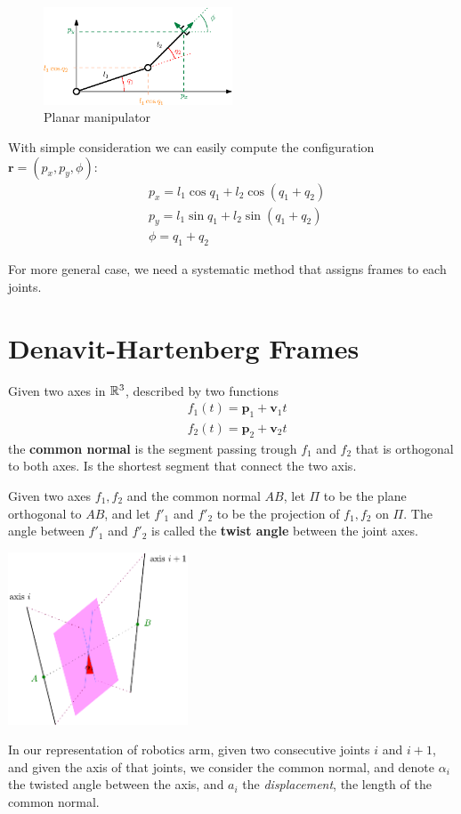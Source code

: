 \documentclass[10pt, letterpaper]{report}
\begin{document}
\begin{figure}[h!]
    \centering
    \includegraphics[width=0.5\textwidth ]{images/simple_dk.eps}
    \caption{Planar manipulator}
    \label{fig:simple_dk}
\end{figure}

With simple consideration we can easily compute the configuration $\mathbf r=(p_x,p_y,\phi)$:\begin{align}
    &p_x=l_1\cos q_1+l_2\cos(q_1+q_2)\\
    &p_y=l_1\sin q_1+l_2\sin(q_1+q_2)\\
    &\phi=q_1+q_2
\end{align}

For more general case, we need a systematic method that assigns frames to each joints.
\section{Denavit-Hartenberg Frames}
\begin{definition}
    Given two axes in ${\mathbb R}^3$, described by two functions\begin{align}
        &f_1(t)=\mathbf p_1+\mathbf v_1t\\ 
        &f_2(t)=\mathbf p_2+\mathbf v_2t
    \end{align}
    the \textbf{common normal} is the segment passing trough $f_1$ and $f_2$ that is orthogonal to both axes. Is the shortest segment that connect the two axis. 
\end{definition}
\begin{definition}
    Given two axes $f_1,f_2$ and the common normal $AB$, let $\Pi$ to be the plane orthogonal to $AB$, and let $f'_1$ and $f'_2$ to be the projection of $f_1,f_2$ on $\Pi$. The angle between $f'_1$ and $f'_2$ is called the \textbf{twist angle} between the joint axes.
\end{definition}
\begin{center}
    \includegraphics[width=0.4\textwidth ]{images/twist_angle.pdf}
\end{center}
In our representation of robotics arm, given two consecutive joints $i$ and $i+1$, and given the axis of that joints, we consider the common normal, and denote $\alpha_i$ the twisted angle between the axis, and $a_i$ the \textit{displacement}, the length of the common normal.\bigskip 
\end{document}
